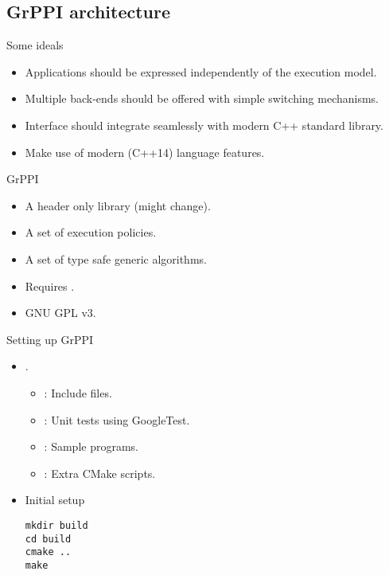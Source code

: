 \subsection{GrPPI architecture}

\begin{frame}[t]{Some ideals}
\begin{itemize}[<+->]
  \item Applications should be expressed independently of the
        execution model.
  \item Multiple back-ends should be offered with simple switching
        mechanisms.
  \item Interface should integrate seamlessly with modern C++ standard
        library.
  \item Make use of modern (C++14) language features.
\end{itemize}
\end{frame}

\begin{frame}[t]{GrPPI}
\begin{Large}
\end{Large}
\vfill\pause
\begin{itemize}
  \item A header only library (might change).
  \item A set of execution policies.
  \item A set of type safe generic algorithms.
  \item Requires .
  \item GNU GPL v3.
\end{itemize}
\end{frame}

\begin{frame}[t,fragile]{Setting up GrPPI}
\begin{itemize}
  \item {}.
    \begin{itemize}
      \item {}: Include files.
      \item {}: Unit tests using GoogleTest.
      \item {}: Sample programs.
      \item {}: Extra CMake scripts.
    \end{itemize}
  \vfill\pause
  \item Initial setup
\begin{lstlisting}[style=terminal]
mkdir build
cd build
cmake ..
make
\end{lstlisting}
\end{itemize}
\end{frame}

